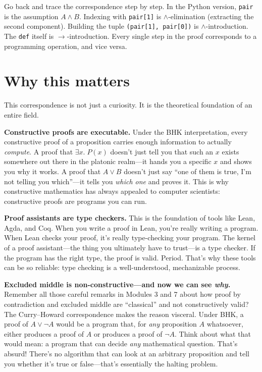 \documentclass[11pt]{article}
\begin{document}
Go back and trace the correspondence step by step. In the Python version, \texttt{pair} is the assumption $A \wedge B$. Indexing with \texttt{pair[1]} is $\wedge$-elimination (extracting the second component). Building the tuple \texttt{(pair[1], pair[0])} is $\wedge$-introduction. The \texttt{def} itself is $\to$-introduction. Every single step in the proof corresponds to a programming operation, and vice versa.

\section{Why this matters}

This correspondence is not just a curiosity. It is the theoretical foundation of an entire field.

\textbf{Constructive proofs are executable.} Under the BHK interpretation, every constructive proof of a proposition carries enough information to actually \emph{compute}. A proof that $\exists x.\; P(x)$ doesn't just tell you that such an $x$ exists somewhere out there in the platonic realm---it hands you a specific $x$ and shows you why it works. A proof that $A \vee B$ doesn't just say ``one of them is true, I'm not telling you which''---it tells you \emph{which one} and proves it. This is why constructive mathematics has always appealed to computer scientists: constructive proofs are programs you can run.

\textbf{Proof assistants are type checkers.} This is the foundation of tools like Lean, Agda, and Coq. When you write a proof in Lean, you're really writing a program. When Lean checks your proof, it's really type-checking your program. The kernel of a proof assistant---the thing you ultimately have to trust---is a type checker. If the program has the right type, the proof is valid. Period. That's why these tools can be so reliable: type checking is a well-understood, mechanizable process.

\textbf{Excluded middle is non-constructive---and now we can see \emph{why}.} Remember all those careful remarks in Modules 3 and 7 about how proof by contradiction and excluded middle are ``classical'' and not constructively valid? The Curry--Howard correspondence makes the reason visceral. Under BHK, a proof of $A \vee \lnot A$ would be a program that, for \emph{any} proposition $A$ whatsoever, either produces a proof of $A$ or produces a proof of $\lnot A$. Think about what that would mean: a program that can decide \emph{any} mathematical question. That's absurd! There's no algorithm that can look at an arbitrary proposition and tell you whether it's true or false---that's essentially the halting problem.
\end{document}
